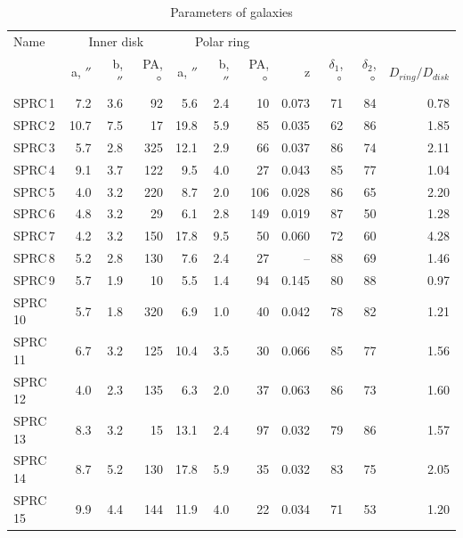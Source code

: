 \documentclass{ab}
\def\degr{\hbox{$^\circ$}}
\begin{document}
\begin{table}
\caption{Parameters of galaxies}
\label{tab1}
\begin{tabular}{l|r|r|r|r|r|r|r|r|r|r}\hline\hline
Name    & \multicolumn{3}{c|}{Inner disk}	& \multicolumn{3}{c|}{ Polar ring} &     & &    &   \\	
   	    &a, $''$&b, $''$ &PA, $\degr$&a, $''$&b, $''$ &PA, $\degr$& z & $\delta_1$, $\degr$& $\delta_2$, $\degr$ & $D_{ring}/D_{disk}$\\	
\hline
  SPRC\,1&   7.2 &    3.6 &    92 &    5.6 &    2.4 &    10 &  0.073 &     71 &     84 &   0.78 \\
  SPRC\,2&  10.7 &    7.5 &    17 &   19.8 &    5.9 &    85 &  0.035 &     62 &     86 &   1.85 \\
  SPRC\,3&   5.7 &    2.8 &   325 &   12.1 &    2.9 &    66 &  0.037 &     86 &     74 &   2.11 \\
  SPRC\,4&   9.1 &    3.7 &   122 &    9.5 &    4.0 &    27 &  0.043 &     85 &     77 &   1.04 \\
  SPRC\,5&   4.0 &    3.2 &   220 &    8.7 &    2.0 &   106 &  0.028 &     86 &     65 &   2.20 \\
  SPRC\,6&   4.8 &    3.2 &    29 &    6.1 &    2.8 &   149 &  0.019 &     87 &     50 &   1.28 \\
  SPRC\,7&   4.2 &    3.2 &   150 &   17.8 &    9.5 &    50 &  0.060 &     72 &     60 &   4.28 \\
  SPRC\,8&   5.2 &    2.8 &   130 &    7.6 &    2.4 &    27 &     -- &     88 &     69 &   1.46 \\
  SPRC\,9&   5.7 &    1.9 &    10 &    5.5 &    1.4 &    94 &  0.145 &     80 &     88 &   0.97 \\
 SPRC\,10&   5.7 &    1.8 &   320 &    6.9 &    1.0 &    40 &  0.042 &     78 &     82 &   1.21 \\
 SPRC\,11&   6.7 &    3.2 &   125 &   10.4 &    3.5 &    30 &  0.066 &     85 &     77 &   1.56 \\
 SPRC\,12&   4.0 &    2.3 &   135 &    6.3 &    2.0 &    37 &  0.063 &     86 &     73 &   1.60 \\
 SPRC\,13&   8.3 &    3.2 &    15 &   13.1 &    2.4 &    97 &  0.032 &     79 &     86 &   1.57 \\
 SPRC\,14&   8.7 &    5.2 &   130 &   17.8 &    5.9 &    35 &  0.032 &     83 &     75 &   2.05 \\
 SPRC\,15&   9.9 &    4.4 &   144 &   11.9 &    4.0 &    22 &  0.034 &     71 &     53 &   1.20 \\

\end{tabular}
\end{table}
\end{document}
